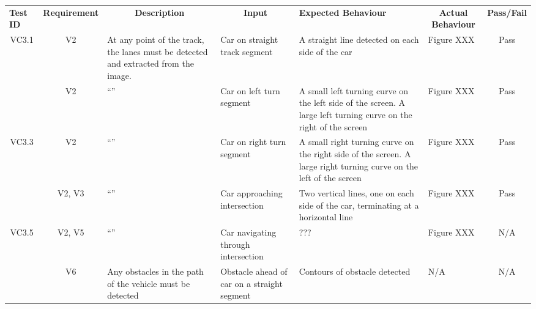 \documentclass [10pt]{article}
\begin{document}
    
\begin{longtable}{ | p{ } | p{ } |  p{ } |  p{ } | p{ } | p{ } |  p{ } |}  \hline

    \rowcolor{subsectionC}\textbf{Test ID} 
    & \multicolumn{1}{c|}{\textbf{Requirement} }
    & \multicolumn{1}{c|}{\textbf{Description} }
    & \multicolumn{1}{c|}{\textbf{Input} }
    & \textbf{Expected Behaviour} 
    & \multicolumn{1}{c|}{\textbf{Actual Behaviour} }
    & \textbf{Pass/Fail} \\  
    
    \multicolumn{1}{|c|}{VC3.1} 
    & \multicolumn{1}{c|}{V2}
    & At any point of the track, the lanes must be detected and extracted from the image.
    & Car on straight track segment
    & A straight line detected on each side of the car
    & Figure XXX
    & \multicolumn{1}{c|}{Pass}\\  \hline
    
    
    \rowcolor{tableCell}\multicolumn{1}{|c|}{VC3.2} 
    & \multicolumn{1}{c|}{V2}
    & ``''
    & Car on left turn segment
    & A small left turning curve on the left side of the screen. A large left turning curve on the right of the screen 
    & Figure XXX
    & \multicolumn{1}{c|}{Pass}\\ \hline
    
    
    \multicolumn{1}{|c|}{VC3.3} 
    & \multicolumn{1}{c|}{V2}
    & ``''
    & Car on right turn segment
    & A small right turning curve on the right side of the screen. A large right turning curve on the left of the screen 
    & Figure XXX
    & \multicolumn{1}{c|}{Pass}\\ \hline
     
     
    \rowcolor{tableCell}\multicolumn{1}{|c|}{VC3.4} 
    &\multicolumn{1}{c|}{ V2, V3}
    & ``''
    & Car approaching intersection
    & Two vertical lines, one  on each side of the car, terminating at a horizontal line 
    & Figure XXX
    & \multicolumn{1}{c|}{Pass}\\ \hline
    
    
    \multicolumn{1}{|c|}{VC3.5} 
    & \multicolumn{1}{c|}{V2, V5}
    & ``''
    & Car navigating through intersection
    & ??? 
    & Figure XXX
    & \multicolumn{1}{c|}{N/A}\\ \hline
    
    
   \rowcolor{tableCell} \multicolumn{1}{|c|}{VC3.6} 
    & \multicolumn{1}{c|}{V6}
    & Any obstacles in the path of the vehicle must be detected
    & Obstacle ahead of car on a straight segment
    & Contours of obstacle detected
    & N/A
    & \multicolumn{1}{c|}{N/A}\\ \hline
    

\end{longtable}
\end{document}
